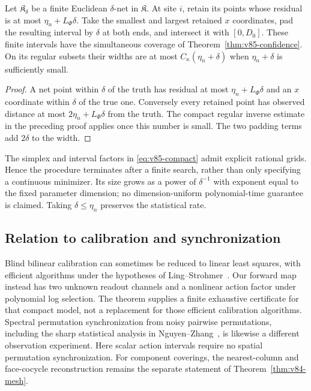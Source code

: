 \begin{proposition}\label{prop:v85-grid}
Let $\mathfrak K_\delta$ be a finite Euclidean $\delta$-net in
$\mathfrak K$. At site $i$, retain its points whose residual is at
most $\eta_n+L_\Phi\delta$. Take the smallest and largest retained
$x$ coordinates, pad the resulting interval by $\delta$ at both
ends, and intersect it with $[0,D_0]$. These finite intervals have the
simultaneous coverage of Theorem~\ref{thm:v85-confidence}.
On its regular subsets their widths are at most
$C_\kappa(\eta_n+\delta)$ when $\eta_n+\delta$ is sufficiently small.
\end{proposition}
\begin{proof}
A net point within $\delta$ of the truth has residual at most
$\eta_n+L_\Phi\delta$ and an $x$ coordinate within $\delta$ of the
true one. Conversely every retained point has observed distance at
most $2\eta_n+L_\Phi\delta$ from the truth. The compact regular
inverse estimate in the preceding proof applies once this number is
small. The two padding terms add $2\delta$ to the width.
\end{proof}
The simplex and interval factors in \eqref{eq:v85-compact} admit
explicit rational grids. Hence the procedure terminates after a finite
search, rather than only specifying a continuous minimizer. Its size
grows as a power of $\delta^{-1}$ with exponent equal to the fixed
parameter dimension; no dimension-uniform polynomial-time guarantee
is claimed. Taking $\delta\le\eta_n$ preserves the statistical rate.

\subsection{Relation to calibration and synchronization}
Blind bilinear calibration can sometimes be reduced to linear least
squares, with efficient algorithms under the hypotheses of
Ling--Strohmer~\cite{V85LS}. Our forward map instead has two unknown
readout channels and a nonlinear action factor under polynomial log
selection. The theorem supplies a finite exhaustive certificate for
that compact model, not a replacement for those efficient calibration
algorithms. Spectral permutation synchronization from noisy pairwise
permutations, including the sharp statistical analysis in
Nguyen--Zhang~\cite{V85NZ}, is likewise a different observation
experiment. Here scalar action intervals require no spatial
permutation synchronization. For component coverings, the
nearest-column and face-cocycle reconstruction remains the separate
statement of Theorem~\ref{thm:v84-mesh}.
